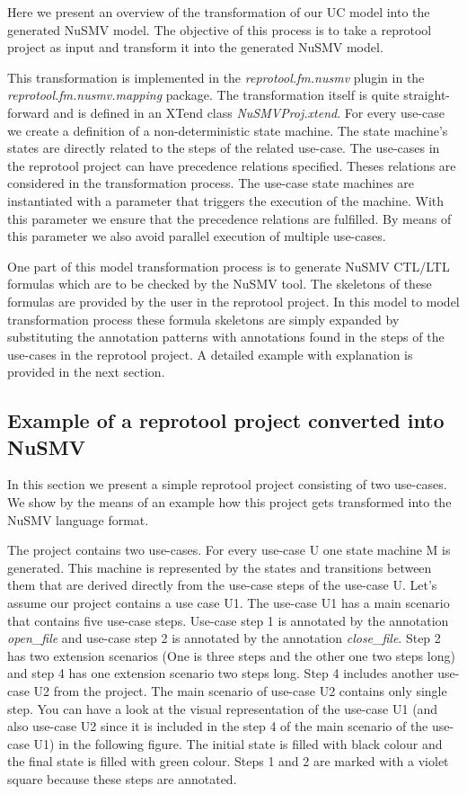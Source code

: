 Here we present an overview of the transformation of our UC model into the generated NuSMV model. The objective of this process is to
take a reprotool project as input and transform it into the generated NuSMV model.

This transformation is implemented in the \emph{reprotool.fm.nusmv} plugin in the \emph{reprotool.fm.nusmv.mapping} package.
The transformation itself is quite straight-forward and is defined in an XTend class \emph{NuSMVProj.xtend}.
For every use-case we create a definition of a non-deterministic state machine.
The state machine's states are directly related to the steps of the related use-case.
The use-cases in the reprotool project can have precedence relations specified. Theses relations are considered in the
transformation process. The use-case state machines are instantiated with a parameter that triggers the execution of the machine.
With this parameter we ensure that the precedence relations are fulfilled. By means of this parameter we also avoid parallel execution
of multiple use-cases.

One part of this model transformation process is to generate NuSMV CTL/LTL formulas which are to be checked by the NuSMV tool. The
skeletons of these formulas are provided by the user in the reprotool project. In this model to model transformation process these
formula skeletons are simply expanded by substituting the annotation patterns with annotations found in the steps of the use-cases
in the reprotool project. A detailed example with explanation is provided in the next section.

\subsection{Example of a reprotool project converted into NuSMV}

In this section we present a simple reprotool project consisting of two use-cases. We show by the means of an example how this project
gets transformed into the NuSMV language format.

The project contains two use-cases. For every use-case U one state machine M is generated. This machine is represented by the states and
transitions between them that are derived directly from the use-case steps of the use-case U. Let's assume our project contains a use
case U1. The use-case U1 has a main scenario that contains five use-case steps. Use-case step 1 is annotated by the annotation \emph{open\_file}
and use-case step 2 is annotated by the annotation \emph{close\_file}. Step 2 has two extension scenarios (One is three steps and the other
one two steps long) and step 4 has one extension scenario two steps long. Step 4 includes another use-case U2 from the project. The
main scenario of use-case U2 contains only single step. You can have a look at the visual representation of the use-case U1 (and also
use-case U2 since it is included in the step 4 of the main scenario of the use-case U1) in the following figure. The initial state is
filled with black colour and the final state is filled with green colour. Steps 1 and 2 are marked with a violet square because these
steps are annotated.

